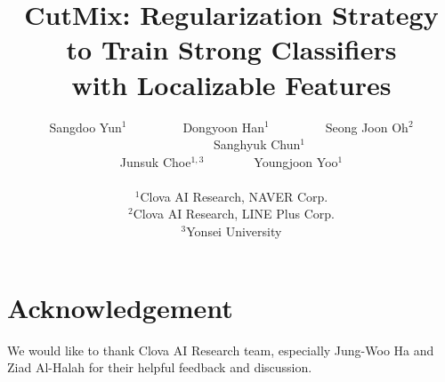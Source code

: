 \documentclass[10pt,twocolumn, letterpaper]{article}
\begin{document}
\title{CutMix: Regularization Strategy to Train Strong Classifiers \\ with Localizable Features}

\author{
Sangdoo Yun$^1$~~~~~~~~~Dongyoon Han$^1$~~~~~~~~~Seong Joon Oh$^2$~~~~~~~~~Sanghyuk Chun$^1$\\ 
Junsuk Choe$^{1,3}$~~~~~~~~Youngjoon Yoo$^1$\\ 
~\\
$^1$Clova AI Research, NAVER Corp.\\
$^2$Clova AI Research, LINE Plus Corp.\\
$^3$Yonsei University \\
}



\maketitle














\section*{Acknowledgement}
We would like to thank Clova AI Research team, especially Jung-Woo Ha and Ziad Al-Halah for their helpful feedback and discussion.


{\small


}

\clearpage
\setcounter{table}{0}
\renewcommand{\thetable}{A\arabic{table}}
\renewcommand{\thefigure}{A\arabic{figure}}
\renewcommand{\thealgorithm}{A\arabic{algorithm}}


\appendix






\end{document}

